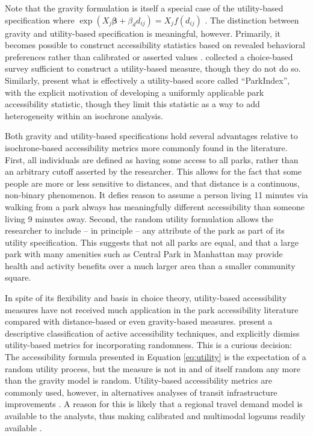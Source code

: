 \documentclass[Crown,sageh.bst]{sagej}
\begin{document}
Note that the gravity formulation is itself a special case of the
utility-based specification where
\(\exp(X_j\boldsymbol{\beta} + \beta_d d_{ij}) = X_j f(d_{ij})\)
\citep{Daly1982}. The distinction between gravity and utility-based
specification is meaningful, however. Primarily, it becomes possible to
construct accessibility statistics based on revealed behavioral
preferences rather than calibrated or asserted values \citep{Handy1997}.
\citet{Kinnell2006} collected a choice-based survey sufficient to
construct a utility-based measure, though they do not do so. Similarly,
\citet{Kaczynski2016} present what is effectively a utility-based score
called ``ParkIndex'', with the explicit motivation of developing a
uniformly applicable park accessibility statistic, though they limit
this statistic as a way to add heterogeneity within an isochrone
analysis.

Both gravity and utility-based specifications hold several advantages
relative to isochrone-based accessibility metrics more commonly found in
the literature. First, all individuals are defined as having some access
to all parks, rather than an arbitrary cutoff asserted by the
researcher. This allows for the fact that some people are more or less
sensitive to distances, and that distance is a continuous, non-binary
phenomenon. It defies reason to assume a person living 11 minutes via
walking from a park always has meaningfully different accessibility than
someone living 9 minutes away. Second, the random utility formulation
allows the researcher to include -- in principle -- any attribute of the
park as part of its utility specification. This suggests that not all
parks are equal, and that a large park with many amenities such as
Central Park in Manhattan may provide health and activity benefits over
a much larger area than a smaller community square.

In spite of its flexibility and basis in choice theory, utility-based
accessibility measures have not received much application in the park
accessibility literature compared with distance-based or even
gravity-based measures. \citet{Vale2016} present a descriptive
classification of active accessibility techniques, and explicitly
dismiss utility-based metrics for incorporating randomness. This is a
curious decision: The accessibility formula presented in Equation
\ref{eq:utility} is the expectation of a random utility process, but the
measure is not in and of itself random any more than the gravity model
is random. Utility-based accessibility metrics are commonly used,
however, in alternatives analyses of transit infrastructure improvements
\citep{DeJong2007}. A reason for this is likely that a regional travel
demand model is available to the analysts, thus making calibrated and
multimodal logsums readily available \citep{Geurs2010}.
\end{document}
